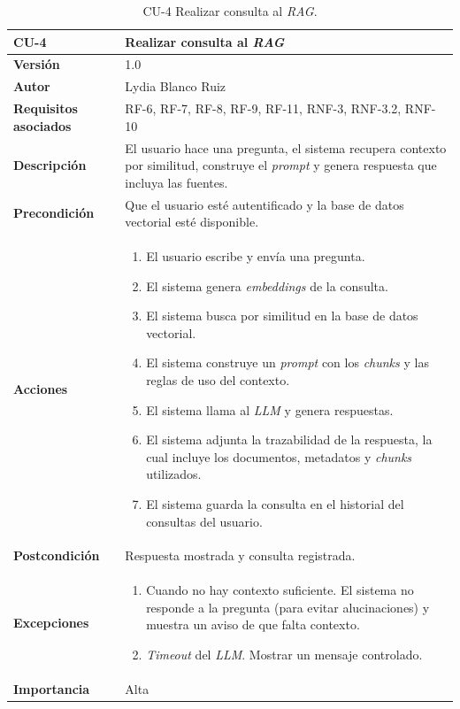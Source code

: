 \begin{table}[p]
	\centering
	\begin{tabularx}{\linewidth}{ p{} p{} }
		\toprule
		\textbf{CU-4}    & \textbf{Realizar consulta al \textit{RAG}}\\
		\toprule
		\textbf{Versión}              & 1.0    \\
		\textbf{Autor}                & Lydia Blanco Ruiz \\
		\textbf{Requisitos asociados} & RF-6, RF-7, RF-8, RF-9, RF-11, RNF-3, RNF-3.2, RNF-10 \\
		\textbf{Descripción}          & El usuario hace una pregunta, el sistema recupera contexto por similitud, construye el \textit{prompt} y genera respuesta que incluya las fuentes. \\
		\textbf{Precondición}         & Que el usuario esté autentificado y la base de datos vectorial esté disponible. \\
		\textbf{Acciones}             &
		\begin{enumerate}
			\def\labelenumi{\arabic{enumi}.}
			\tightlist
			\item El usuario escribe y envía una pregunta.
			\item El sistema genera \textit{embeddings} de la consulta.
			\item El sistema busca por similitud en la base de datos vectorial.
			\item El sistema construye un \textit{prompt} con los \textit{chunks} y las reglas de uso del contexto.
			\item El sistema llama al \textit{LLM} y genera respuestas.
			\item El sistema adjunta la trazabilidad de la respuesta, la cual incluye los documentos, metadatos y \textit{chunks} utilizados.
			\item El sistema guarda la consulta en el historial del consultas del usuario.
		\end{enumerate}\\
		\textbf{Postcondición}        & Respuesta mostrada y consulta registrada. \\
		\textbf{Excepciones}          & 
		\begin{enumerate}
			\def\labelenumi{\arabic{enumi}.}
			\tightlist
			\item Cuando no hay contexto suficiente. El sistema no responde a la pregunta (para evitar alucinaciones) y muestra un aviso de que falta contexto.
			\item \textit{Timeout} del \textit{LLM}. Mostrar un mensaje controlado. 	
		\end{enumerate}\\
		\textbf{Importancia}          & Alta  \\
		\bottomrule
	\end{tabularx}
	\caption{CU-4 Realizar consulta al \textit{RAG}.}
\end{table}

